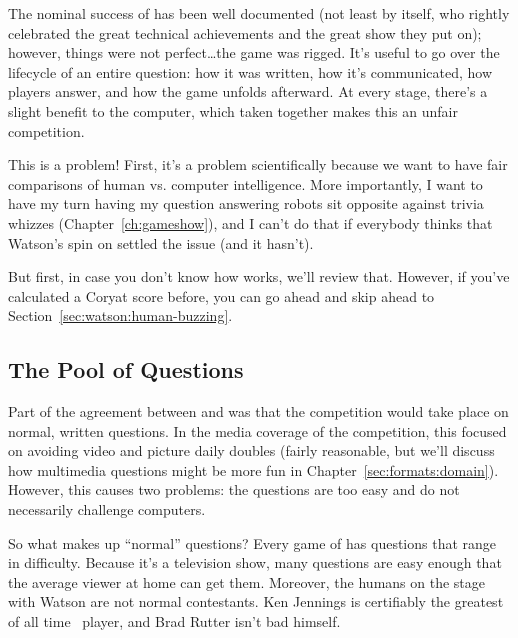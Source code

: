 The nominal success of \watson{} has been well documented (not least by 
itself, who rightly celebrated the great technical achievements and the great
show they put on); however,
things were not perfect\dots the game was rigged.
%
It's useful to go over the lifecycle of an entire question: how it was
written, how it's communicated, how players answer, and how the game
unfolds afterward.
%
At every stage, there's a slight benefit to the computer, which taken
together makes this an unfair competition.

This is a problem!  First, it's a problem scientifically because we
want to have fair comparisons of human vs. computer intelligence.
%
More importantly, I want to have my turn having my question answering
robots sit opposite against trivia whizzes (Chapter~\ref{ch:gameshow}),
and I can't do that if everybody thinks that Watson's spin
on \jeopardy{} settled the issue (and it hasn't).


But first, in case you don't know how \jeopardy{} works, we'll review
that.
%
However, if you've calculated a Coryat score before, you can go ahead
and skip ahead to Section~\ref{sec:watson:human-buzzing}.


\subsection{The Pool of Questions}


Part of the agreement between \jeopardy{} and  was that the
competition would take place on normal, written questions.
%
In the media coverage of the competition, this focused on avoiding
video and picture daily doubles (fairly reasonable, but we'll discuss
how multimedia questions might be more fun in Chapter~\ref{sec:formats:domain}).
%
However, this causes two problems: the questions are too easy and do
not necessarily challenge computers.

So what makes up ``normal'' questions?
%
Every game of \jeopardy{} has questions that range in difficulty.
%
Because it's a television show, many questions are easy enough that
the average viewer at home can get them.
%
Moreover, the humans on the stage with Watson are not normal contestants.
%
Ken Jennings is certifiably the greatest of all
time~\citep[]{low-20} \jeopardy{} player, and Brad Rutter
isn't bad himself.

